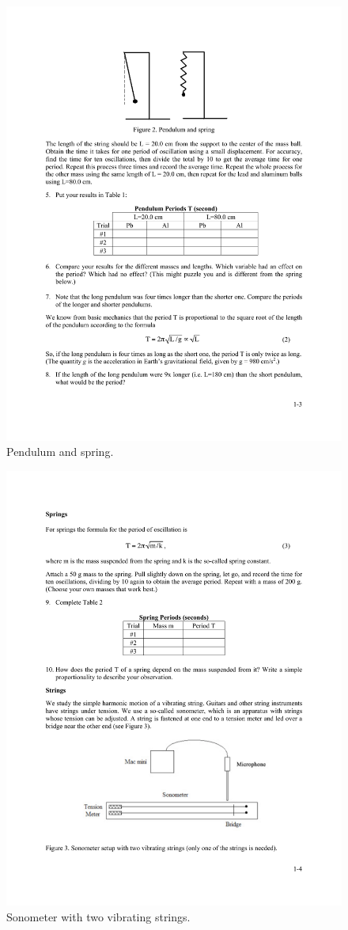 \documentclass[11pt]{NSF}
\begin{document}
\begin{figure}[hbtp]
\begin{center}
\includegraphics[width=.4\textwidth]{fig1_2}
\caption{Pendulum and spring.}
\label{f:2}
\end{center}
\end{figure}
%
%
\begin{figure}[hbtp]
\begin{center}
\includegraphics[width=.75\textwidth]{fig1_3}
\caption{Sonometer with two vibrating strings.}
\label{f:3}
\end{center}
\end{figure}
%
%
\end{document}
